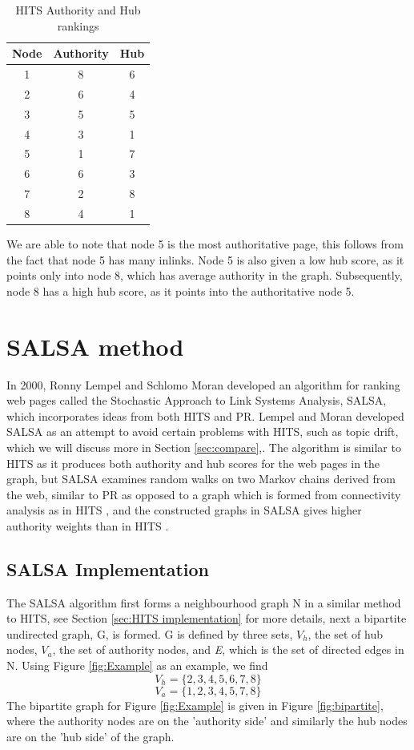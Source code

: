 \documentclass[11pt]{report}
\begin{document}
\begin{table}[h] \caption{HITS Authority and Hub rankings}
 \centering
 \begin{tabular} {c| c c} 
 Node & Authority & Hub \\ [0.5ex] 
 \hline
 1&8&6\\
 2&6&4\\
 3&5&5\\
 4&3&1\\
 5&1&7\\
 6&6&3\\
 7&2&8\\
 8&4&1\\
 \end{tabular}
 \label{Table:HITS}
\end{table} 

We are able to note that node 5 is the most authoritative page, this follows from the fact that node 5 has many inlinks. Node 5 is also given a low hub score, as it points only into node 8, which has average authority in the graph. Subsequently, node 8 has a high hub score, as it points into the authoritative node 5.

\section{SALSA method} \label{sec:SALSA}
In 2000, Ronny Lempel and Schlomo Moran developed an algorithm for ranking web pages called the Stochastic Approach to Link Systems Analysis, SALSA, which incorporates ideas from both HITS and PR. Lempel and Moran developed SALSA as an attempt to avoid certain problems with HITS, such as topic drift, which we will discuss more in Section \ref{sec:compare},\cite{bonato}. The algorithm is similar to HITS as it produces both authority and hub scores for the web pages in the graph, but SALSA examines random walks on two Markov chains derived from the web, similar to PR as opposed to a graph which is formed from connectivity analysis as in HITS \cite{lempel2000stochastic}, and the constructed graphs in SALSA gives higher authority weights than in HITS \cite{bonato}. 

\subsection{SALSA Implementation}\label{sec:SALSA implementation}
The SALSA algorithm first forms a neighbourhood graph N in a similar method to HITS, see Section \ref{sec:HITS implementation} for more details, next a bipartite undirected graph, G, is formed. G is defined by three sets, $V_h$, the set of hub nodes, $V_a$, the set of authority nodes, and \textit{E}, which is the set of directed edges in N. Using Figure \ref{fig:Example} as an example, we find 
\[V_h = \{2,3,4,5,6,7,8\} \]
\[V_a = \{1,2,3,4,5,7,8\} \]
The bipartite graph for Figure \ref{fig:Example} is given in Figure \ref{fig:bipartite}, where the authority nodes are on the 'authority side' and similarly the hub nodes are on the 'hub side' of the graph. 
\end{document}
